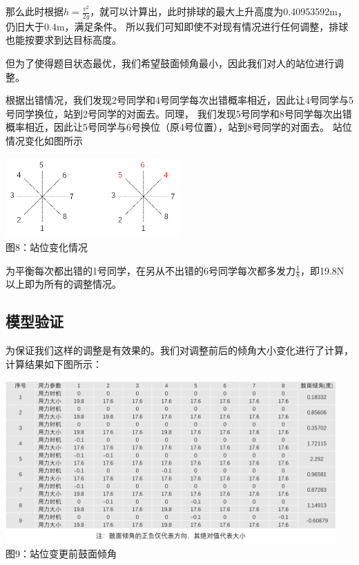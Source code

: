\documentclass[UTF8]{article}
\begin{document}
那么此时根据$h=\frac{v^2}{2g}$，就可以计算出，此时排球的最大上升高度为0.40953592m，仍旧大于0.4m，满足条件。
所以我们可知即使不对现有情况进行任何调整，排球也能按要求到达目标高度。

但为了使得题目状态最优，我们希望鼓面倾角最小，因此我们对人的站位进行调整。

根据出错情况，我们发现2号同学和4号同学每次出错概率相近，因此让4号同学与5号同学换位，站到2号同学的对面去。同理，
我们发现5号同学和8号同学每次出错概率相近，因此让5号同学与6号换位（原4号位置），站到8号同学的对面去。
站位情况变化如图所示

\begin{center}
    \includegraphics[width=0.5\textwidth]{figure12.png}\\ 
    图8：站位变化情况  
\end{center}

为平衡每次都出错的1号同学，在另从不出错的6号同学每次都多发力$\frac{1}{8}$，即19.8N
以上即为所有的调整情况。

\subsection{模型验证}
为保证我们这样的调整是有效果的。我们对调整前后的倾角大小变化进行了计算，计算结果如下图所示：

\begin{center}
    \includegraphics[width=0.95\textwidth]{figure13.png}\\ 
    图9：站位变更前鼓面倾角  
\end{center}
\end{document}

